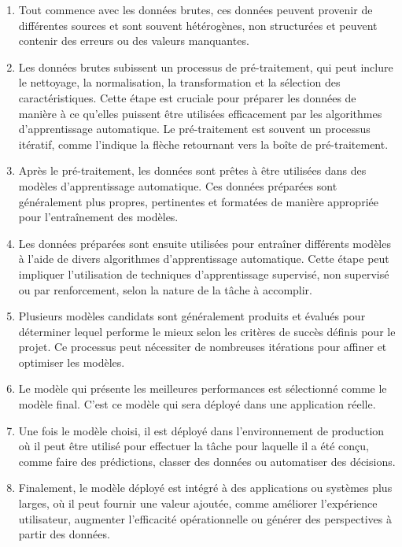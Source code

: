 \begin{enumerate}
    \item Tout commence avec les données brutes, ces données peuvent provenir de différentes sources et sont souvent hétérogènes, non structurées et peuvent contenir des erreurs ou des valeurs manquantes.

    \item Les données brutes subissent un processus de pré-traitement, qui peut inclure le nettoyage, la normalisation, la transformation et la sélection des caractéristiques. Cette étape est cruciale pour préparer les données de manière à ce qu'elles puissent être utilisées efficacement par les algorithmes d'apprentissage automatique. Le pré-traitement est souvent un processus itératif, comme l'indique la flèche retournant vers la boîte de pré-traitement.

    \item Après le pré-traitement, les données sont prêtes à être utilisées dans des modèles d'apprentissage automatique. Ces données préparées sont généralement plus propres, pertinentes et formatées de manière appropriée pour l'entraînement des modèles.

    \item Les données préparées sont ensuite utilisées pour entraîner différents modèles à l'aide de divers algorithmes d'apprentissage automatique. Cette étape peut impliquer l'utilisation de techniques d'apprentissage supervisé, non supervisé ou par renforcement, selon la nature de la tâche à accomplir.

    \item Plusieurs modèles candidats sont généralement produits et évalués pour déterminer lequel performe le mieux selon les critères de succès définis pour le projet. Ce processus peut nécessiter de nombreuses itérations pour affiner et optimiser les modèles.

    \item Le modèle qui présente les meilleures performances est sélectionné comme le modèle final. C’est ce modèle qui sera déployé dans une application réelle.

    \item Une fois le modèle choisi, il est déployé dans l'environnement de production où il peut être utilisé pour effectuer la tâche pour laquelle il a été conçu, comme faire des prédictions, classer des données ou automatiser des décisions.

    \item Finalement, le modèle déployé est intégré à des applications ou systèmes plus larges, où il peut fournir une valeur ajoutée, comme améliorer l'expérience utilisateur, augmenter l'efficacité opérationnelle ou générer des perspectives à partir des données.
\end{enumerate}


